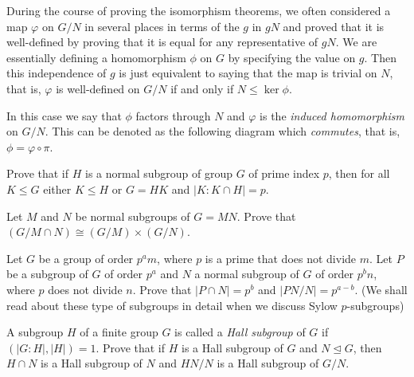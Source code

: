 During the course of proving the isomorphism theorems, we often considered a map $\varphi$ on $G/N$ in several places in terms of the $g$ in $gN$ and proved that it is well-defined by proving that it is equal for any representative of $gN$. We are essentially defining a homomorphism $\phi$ on $G$ by specifying the value on $g$. Then this independence of $g$ is just equivalent to saying that the map is trivial on $N$, that is, $\varphi$ is well-defined on $G/N$ if and only if $N\leq\ker\phi$.

In this case we say that $\phi$ factors through $N$ and $\varphi$ is the \textit{induced homomorphism} on $G/N$. This can be denoted as the following diagram which \textit{commutes}, that is, $\phi=\varphi\circ\pi$.
\begin{center}
\end{center}

\begin{exercise}
    Prove that if $H$ is a normal subgroup of group $G$ of prime index $p$, then for all $K\leq G$ either $K\leq H$ or $G=HK$ and $|K:K\cap H|=p$.
\end{exercise}

\begin{exercise}
    Let $M$ and $N$ be normal subgroups of $G=MN$. Prove that $(G/M\cap N)\cong (G/M)\times (G/N)$.
\end{exercise}

\begin{exercise}
    Let $G$ be a group of order $p^a m$, where $p$ is a prime that does not divide $m$. Let $P$ be a subgroup of $G$ of order $p^a$ and $N$ a normal subgroup of $G$ of order $p^bn$, where $p$ does not divide $n$. Prove that $|P\cap N|=p^b$ and $|PN/N|=p^{a-b}$. (We shall read about these type of subgroups in detail when we discuss Sylow $p$-subgroups)
\end{exercise}

\begin{exercise}
    A subgroup $H$ of a finite group $G$ is called a \textit{Hall subgroup} of $G$ if $(|G:H|,|H|)=1$. Prove that if $H$ is a Hall subgroup of $G$ and $N\unlhd G$, then $H\cap N$ is a Hall subgroup of $N$ and $HN/N$ is a Hall subgroup of $G/N$.
\end{exercise}

